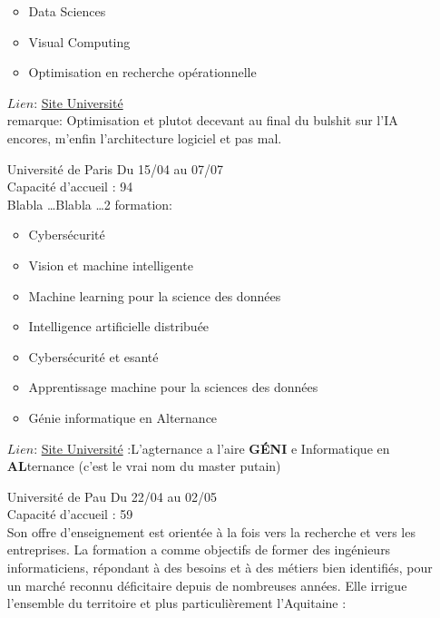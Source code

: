 \documentclass[a4paper,11pt]{article}
\begin{document}
\begin{enumerate}
\begin{itemize}
                    \item Data Sciences
                    \item Visual Computing
                    \item Optimisation en recherche opérationnelle
                \end{itemize}
                $Lien$: \href{https://sciences-techniques.univ-nantes.fr/formations/masters/master-informatique}{Site Université}
                \\remarque: Optimisation et plutot decevant au final du bulshit sur l'IA encores, m'enfin l'architecture logiciel et pas mal.
\\
        \item [\color{LightOrangeHaf}Université de Paris] Du 15/04 au 07/07
                \\Capacité d'accueil : 94
                \\Blabla \ldots Blabla \dots 2 formation:
                \begin{itemize}
                    \item Cybersécurité
                    \item Vision et machine intelligente
                    \item Machine learning pour la science des données
                    \item Intelligence artificielle distribuée
                    \item Cybersécurité et esanté
                    \item Apprentissage machine pour la sciences des données
                    \item Génie informatique en Alternance
                \end{itemize}
                    $Lien$: \href{https://odf.u-paris.fr/fr/offre-de-formation/master-XB/sciences-technologies-sante-STS/informatique-K2NDIF4R.html}{Site Université}
                    :L'agternance a l'aire \textbf{G\'{E}NI} e Informatique en \textbf{AL}ternance (c'est le vrai nom du master putain) 
\\
        \item [\color{LightOrangeHaf}Université de Pau] Du 22/04 au 02/05
                \\Capacité d'accueil : 59
                \\Son offre d’enseignement est orientée à la fois vers la recherche et vers les entreprises. La formation a comme objectifs de former des ingénieurs informaticiens, répondant à des besoins et à des métiers bien identifiés, pour un marché reconnu déficitaire depuis de nombreuses années. Elle irrigue l’ensemble du territoire et plus particulièrement l’Aquitaine :

\end{enumerate}
\end{document}

